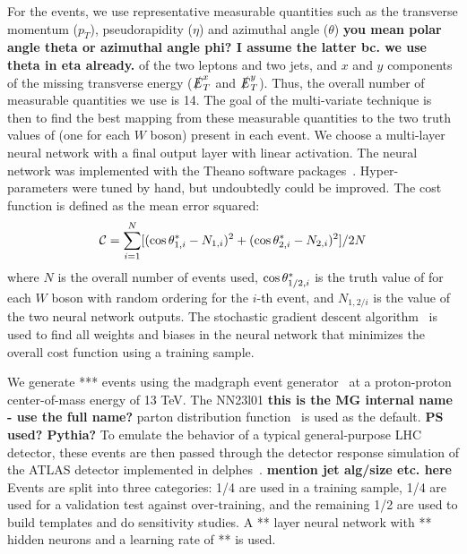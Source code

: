 For the \ssWW events, we use representative measurable quantities such
as the transverse momentum ($p_T$), pseudorapidity ($\eta$) and
azimuthal angle ($\theta$) {\bf you mean polar angle theta or
  azimuthal angle phi? I assume the latter bc. we use theta in eta
  already.} of the two leptons and two jets, and $x$ and $y$
components of the missing transverse energy ($\slashed{E}_T^x$ and
$\slashed{E}_T^y$).  Thus, the overall number of measurable quantities
we use is 14. The goal of the multi-variate technique is then to find
the best mapping from these measurable quantities to the two truth
values of \cts (one for each $W$ boson) present in each event.  We
choose a multi-layer neural network with a final output layer with
linear activation. The neural network was implemented with the Theano
software packages~\cite{theano}. Hyper-parameters were tuned by hand,
but undoubtedly could be improved.  The cost function is defined as
the mean error squared: \small
\begin{equation}
{\cal{C}}= \sum_{i=1}^{N} [(\ctsnb_{1,i} -N_{1,i})^2+(\ctsnb_{2,i}-N_{2,i})^2]/2N
\end{equation}
\normalsize where $N$ is the overall number of events used,
$ \cos  \theta^{*}  _{1/2,i}$ is the truth value of \cts for each $W$ boson with
random ordering for the $i$-th event, and $N_{1,2/i}$ is the value of
the two neural network outputs.  The stochastic gradient descent
algorithm~\cite{sgd} is used to find all weights and biases in the
neural network that minimizes the overall cost function using a
training sample.

We generate *** \ssWW events using the {\sc madgraph} event
generator~\cite{madgraph} at a proton-proton center-of-mass energy of
13 TeV.  The NN23l01 {\bf this is the MG internal name - use the full
  name?} parton distribution function~\cite{pdf} is used as the
default. {\bf PS used? Pythia?} To emulate the behavior of a typical
general-purpose LHC detector, these events are then passed through the
detector response simulation of the ATLAS detector implemented in {\sc
  delphes}~\cite{delphes}. {\bf mention jet alg/size etc. here} Events
are split into three categories: 1/4 are used in a training sample,
1/4 are used for a validation test against over-training, and the
remaining 1/2 are used to build templates and do sensitivity
studies. A ** layer neural network with ** hidden neurons and a
learning rate of ** is used.


